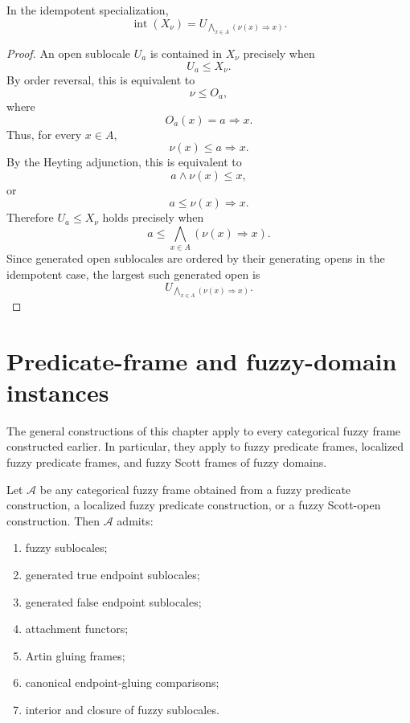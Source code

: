 \begin{theorem}
\label{thm:idempotent-interior-formula}
In the idempotent specialization,
\[
    \operatorname{int}(X_\nu)
    =
    U_{\bigwedge_{x\in A}(\nu(x)\Rightarrow x)}.
\]
\end{theorem}

\begin{proof}
An open sublocale \(U_a\) is contained in \(X_\nu\) precisely when
\[
    U_a\leq X_\nu.
\]
By order reversal, this is equivalent to
\[
    \nu\leq O_a,
\]
where
\[
    O_a(x)=a\Rightarrow x.
\]
Thus, for every \(x\in A\),
\[
    \nu(x)\leq a\Rightarrow x.
\]
By the Heyting adjunction, this is equivalent to
\[
    a\wedge\nu(x)\leq x,
\]
or
\[
    a\leq\nu(x)\Rightarrow x.
\]
Therefore \(U_a\leq X_\nu\) holds precisely when
\[
    a\leq
    \bigwedge_{x\in A}(\nu(x)\Rightarrow x).
\]
Since generated open sublocales are ordered by their generating opens in the
idempotent case, the largest such generated open is
\[
    U_{\bigwedge_{x\in A}(\nu(x)\Rightarrow x)}.
\]
\end{proof}

\section{Predicate-frame and fuzzy-domain instances}
\label{sec:predicate-frame-fuzzy-domain-instances-corrected}

The general constructions of this chapter apply to every categorical fuzzy
frame constructed earlier.  In particular, they apply to fuzzy predicate
frames, localized fuzzy predicate frames, and fuzzy Scott frames of fuzzy
domains.

\begin{proposition}
\label{prop:predicate-frame-scott-frame-instances}
Let \(\mathcal A\) be any categorical fuzzy frame obtained from a fuzzy
predicate construction, a localized fuzzy predicate construction, or a fuzzy
Scott-open construction.  Then \(\mathcal A\) admits:

\begin{enumerate}
    \item fuzzy sublocales;
    \item generated true endpoint sublocales;
    \item generated false endpoint sublocales;
    \item attachment functors;
    \item Artin gluing frames;
    \item canonical endpoint-gluing comparisons;
    \item interior and closure of fuzzy sublocales.
\end{enumerate}
\end{proposition}

